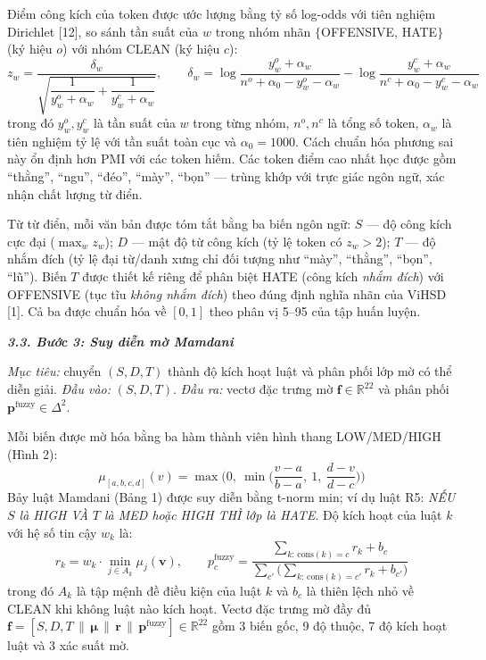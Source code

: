 \documentclass[11pt,a4paper]{article}
\newcommand{\subsecvn}[1]{\vspace{6pt}\noindent\textbf{\textit{#1}}\vspace{6pt}\par\nopagebreak}
\begin{document}
Điểm công kích của token được ước lượng bằng tỷ số log-odds với tiên nghiệm Dirichlet [12], so sánh tần suất của $w$ trong nhóm nhãn $\{$OFFENSIVE, HATE$\}$ (ký hiệu $o$) với nhóm CLEAN (ký hiệu $c$):
\begin{equation}
z_w = \frac{\delta_w}{\sqrt{\dfrac{1}{y_w^{o}+\alpha_w} + \dfrac{1}{y_w^{c}+\alpha_w}}}, \qquad
\delta_w = \log\frac{y_w^{o}+\alpha_w}{n^{o}+\alpha_0-y_w^{o}-\alpha_w} - \log\frac{y_w^{c}+\alpha_w}{n^{c}+\alpha_0-y_w^{c}-\alpha_w}
\end{equation}
trong đó $y_w^{o}, y_w^{c}$ là tần suất của $w$ trong từng nhóm, $n^{o}, n^{c}$ là tổng số token, $\alpha_w$ là tiên nghiệm tỷ lệ với tần suất toàn cục và $\alpha_0 = 1000$. Cách chuẩn hóa phương sai này ổn định hơn PMI với các token hiếm. Các token điểm cao nhất học được gồm ``thằng'', ``ngu'', ``đéo'', ``mày'', ``bọn'' — trùng khớp với trực giác ngôn ngữ, xác nhận chất lượng từ điển.

Từ từ điển, mỗi văn bản được tóm tắt bằng ba biến ngôn ngữ: $S$ — độ công kích cực đại ($\max_w z_w$); $D$ — mật độ từ công kích (tỷ lệ token có $z_w > 2$); $T$ — độ nhắm đích (tỷ lệ đại từ/danh xưng chỉ đối tượng như ``mày'', ``thằng'', ``bọn'', ``lũ''). Biến $T$ được thiết kế riêng để phân biệt HATE (công kích \textit{nhắm đích}) với OFFENSIVE (tục tĩu \textit{không nhắm đích}) theo đúng định nghĩa nhãn của ViHSD [1]. Cả ba được chuẩn hóa về $[0,1]$ theo phân vị 5--95 của tập huấn luyện.

\subsecvn{3.3. Bước 3: Suy diễn mờ Mamdani}

\textit{Mục tiêu:} chuyển $(S,D,T)$ thành độ kích hoạt luật và phân phối lớp mờ có thể diễn giải. \textit{Đầu vào:} $(S,D,T)$. \textit{Đầu ra:} vectơ đặc trưng mờ $\mathbf{f} \in \mathbb{R}^{22}$ và phân phối $\mathbf{p}^{\mathrm{fuzzy}} \in \Delta^2$.

Mỗi biến được mờ hóa bằng ba hàm thành viên hình thang LOW/MED/HIGH (Hình 2):
\begin{equation}
\mu_{[a,b,c,d]}(v) = \max\!\Big(0,\ \min\!\Big(\frac{v-a}{b-a},\ 1,\ \frac{d-v}{d-c}\Big)\Big)
\end{equation}
Bảy luật Mamdani (Bảng 1) được suy diễn bằng t-norm min; ví dụ luật R5: \textit{NẾU $S$ là HIGH VÀ $T$ là MED hoặc HIGH THÌ lớp là HATE}. Độ kích hoạt của luật $k$ với hệ số tin cậy $w_k$ là:
\begin{equation}
r_k = w_k \cdot \min_{j \in A_k} \mu_j(\mathbf{v}), \qquad
p^{\mathrm{fuzzy}}_c = \frac{\sum_{k:\, \mathrm{cons}(k)=c} r_k + b_c}{\sum_{c'}\big(\sum_{k:\, \mathrm{cons}(k)=c'} r_k + b_{c'}\big)}
\end{equation}
trong đó $A_k$ là tập mệnh đề điều kiện của luật $k$ và $b_c$ là thiên lệch nhỏ về CLEAN khi không luật nào kích hoạt. Vectơ đặc trưng mờ đầy đủ $\mathbf{f} = [S,D,T \,\|\, \boldsymbol{\mu} \,\|\, \mathbf{r} \,\|\, \mathbf{p}^{\mathrm{fuzzy}}] \in \mathbb{R}^{22}$ gồm 3 biến gốc, 9 độ thuộc, 7 độ kích hoạt luật và 3 xác suất mờ.
\end{document}
